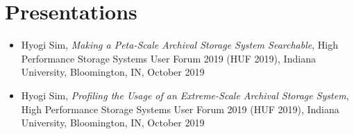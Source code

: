 \section{Presentations}

\begin{itemize}
\item {Hyogi Sim, \emph{Making a Peta-Scale Archival Storage System Searchable},
       High Performance Storage Systems User Forum 2019 (HUF 2019),
       Indiana University, Bloomington, IN, October 2019}
\item {Hyogi Sim, \emph{Profiling the Usage of an Extreme-Scale Archival Storage System},
       High Performance Storage Systems User Forum 2019 (HUF 2019),
       Indiana University, Bloomington, IN, October 2019}
\end{itemize}
